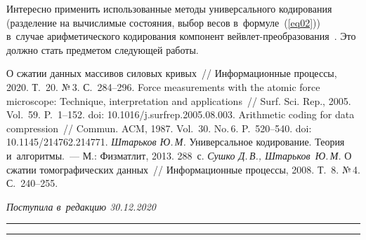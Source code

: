 \begin{multicols}{2}
{ }

Интересно применить использованные методы универсального кодирования (разделение на
 вычислимые состояния, выбор весов в~формуле~(\ref{eq02})) в~случае 
 арифметического кодирования компонент вейв\-лет-пре\-об\-ра\-зо\-ва\-ния~\cite{b1}. 
 Это должно стать предметом сле\-ду\-ющей работы.

{\small\frenchspacing
{%
\begin{thebibliography}{9}
 О сжатии данных массивов силовых кривых~// 
Информационные процессы, 2020. Т.~20. №\,3. С.~284--296.
Force measurements with the atomic force microscope: Technique, interpretation and applications~// 
Surf. Sci. Rep., 2005. Vol.~59. P.~1--152. doi: 10.1016/j.surfrep.2005.08.003.
 Arithmetic coding for data compression~// 
Commun.  ACM, 1987. Vol.~30. No.\,6. P.~520--540. doi: 10.1145/214762.214771.
{\it Штарьков Ю.\,М.} Универсальное кодирование. Теория и~алгоритмы.~--- М.: Физматлит, 2013. 288~с.
{\it Сушко Д.\,В., Штарьков~Ю.\,М.} О сжатии томографических данных~// 
Информационные процессы, 2008. Т.~8. №\,4. С.~240--255.

 \end{thebibliography}

}
}

\end{multicols}

\vspace*{-3pt}

\hfill{\small\textit{Поступила в~редакцию 30.12.2020}}

\vspace*{8pt}




\hrule

\vspace*{2pt}

\hrule


\def\tit{COMPRESSION ALGORITHMS FOR FORCE VOLUME DATA~I:
CODING OF PREDICTION ERRORS}


\def\titkol{Compression algorithms for force volume data~I: Coding of prediction errors}

